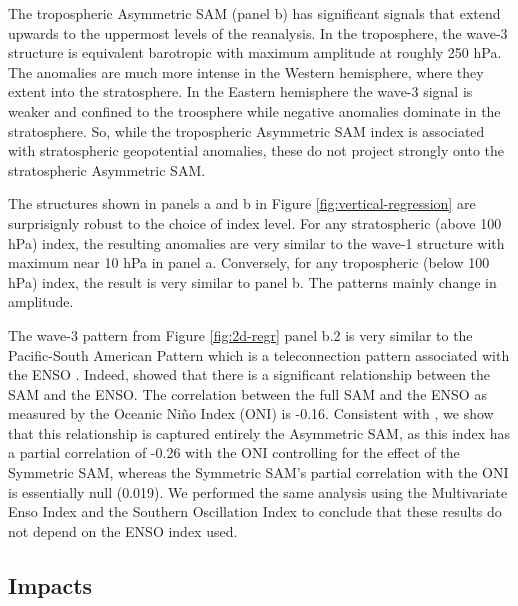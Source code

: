 \documentclass[]{ametsocV5}
\begin{document}
The tropospheric Asymmetric SAM (panel b) has significant signals that
extend upwards to the uppermost levels of the reanalysis. In the
troposphere, the wave-3 structure is equivalent barotropic with maximum
amplitude at roughly 250 hPa. The anomalies are much more intense in the
Western hemisphere, where they extent into the stratosphere. In the
Eastern hemisphere the wave-3 signal is weaker and confined to the
troosphere while negative anomalies dominate in the stratosphere. So,
while the tropospheric Asymmetric SAM index is associated with
stratospheric geopotential anomalies, these do not project strongly onto
the stratospheric Asymmetric SAM.

The structures shown in panels a and b in Figure
\ref{fig:vertical-regression} are surprisignly robust to the choice of
index level. For any stratospheric (above 100 hPa) index, the resulting
anomalies are very similar to the wave-1 structure with maximum near 10
hPa in panel a. Conversely, for any tropospheric (below 100 hPa) index,
the result is very similar to panel b. The patterns mainly change in
amplitude.

The wave-3 pattern from Figure \ref{fig:2d-regr} panel b.2 is very
similar to the Pacific-South American Pattern \citep{mo1987, kidson1988}
which is a teleconnection pattern associated with the ENSO
\citep{karoly1989}. Indeed, \citet{fogt2011} showed that there is a
significant relationship between the SAM and the ENSO. The correlation
between the full SAM and the ENSO as measured by the Oceanic Niño Index
\citep{bamston1997} (ONI) is -0.16. Consistent with \citet{fan2007}, we
show that this relationship is captured entirely the Asymmetric SAM, as
this index has a partial correlation of -0.26 with the ONI controlling
for the effect of the Symmetric SAM, whereas the Symmetric SAM's partial
correlation with the ONI is essentially null (0.019). We performed the
same analysis using the Multivariate Enso Index \citep{wolter2011} and
the Southern Oscillation Index \citep{ropelewski1987} to conclude that
these results do not depend on the ENSO index used.

\subsection{Impacts}

\label{sec:impacts}
\end{document}
